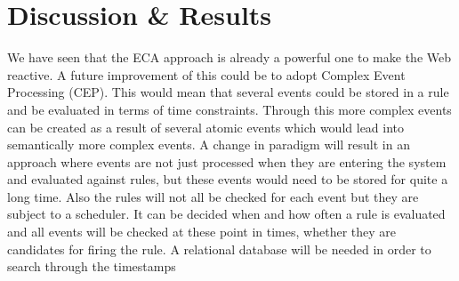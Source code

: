 
\chapter{Discussion \& Results}


%





%
We have seen that the ECA approach is already a powerful one to make the Web reactive.
A future improvement of this could be to adopt Complex Event Processing (CEP).
This would mean that several events could be stored in a rule and be evaluated in terms of time constraints.
Through this more complex events can be created as a result of several atomic events which would lead into semantically more complex events.
A change in paradigm will result in an approach where events are not just processed when they are entering the system and evaluated against rules, but these events would need to be stored for quite a long time.
Also the rules will not all be checked for each event but they are subject to a scheduler.
It can be decided when and how often a rule is evaluated and all events will be checked at these point in times, whether they are candidates for firing the rule.
A relational database will be needed in order to search through the timestamps


